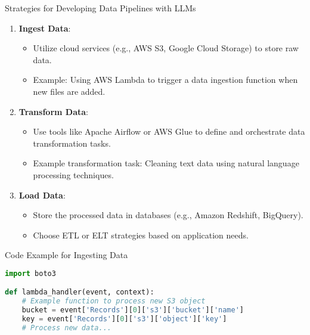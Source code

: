 \documentclass[aspectratio=169]{beamer}
\begin{document}
\begin{frame}[fragile]{Strategies for Developing Data Pipelines with LLMs}
    \begin{enumerate}
        \item \textbf{Ingest Data}:
        \begin{itemize}
            \item Utilize cloud services (e.g., AWS S3, Google Cloud Storage) to store raw data.
            \item Example: Using AWS Lambda to trigger a data ingestion function when new files are added.
        \end{itemize}
        
        \item \textbf{Transform Data}:
        \begin{itemize}
            \item Use tools like Apache Airflow or AWS Glue to define and orchestrate data transformation tasks.
            \item Example transformation task: Cleaning text data using natural language processing techniques.
        \end{itemize}
        
        \item \textbf{Load Data}:
        \begin{itemize}
            \item Store the processed data in databases (e.g., Amazon Redshift, BigQuery).
            \item Choose ETL or ELT strategies based on application needs.
        \end{itemize}
    \end{enumerate}
\end{frame}

\begin{frame}[fragile]{Code Example for Ingesting Data}
    \begin{lstlisting}[language=Python]
import boto3

def lambda_handler(event, context):
    # Example function to process new S3 object
    bucket = event['Records'][0]['s3']['bucket']['name']
    key = event['Records'][0]['s3']['object']['key']
    # Process new data...
    \end{lstlisting}
\end{frame}
\end{document}
